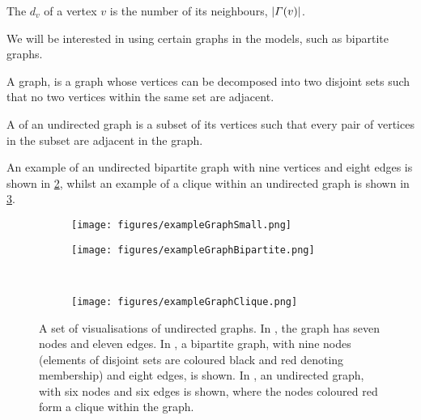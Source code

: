 \begin{definition}
	\label{def:degreeNode}
	The  $d_{v}$ of a vertex $v$ is the number of its neighbours, $\left\vert\Gamma(v)\right\vert$.
\end{definition}
We will be interested in using certain graphs in the models, such as bipartite graphs.
\begin{definition}
	\label{def:bipartiteGraph}
	A  graph, is a graph whose vertices can be decomposed into two disjoint sets such that no two vertices within the same set are adjacent.
\end{definition}
\begin{definition}
	\label{def:clique}
	A  of an undirected graph is a subset of its vertices such that every pair of vertices in the subset are adjacent in the graph.
\end{definition}
An example of an undirected bipartite graph with nine vertices and eight edges is shown in \cref{fig:exampleGraphBipartite}, whilst an example of a clique within an undirected graph is shown in \cref{fig:exampleGraphClique}.

\begin{figure}
\centering
	\begin{subfigure}{.5\textwidth}
		\centering
		\texttt{[image: figures/exampleGraphSmall.png]}
		\caption{}
		\label{fig:exampleGraphSmall}
	\end{subfigure}%
	\begin{subfigure}{.5\textwidth}
		\centering
		\texttt{[image: figures/exampleGraphBipartite.png]}
		\caption{}
		\label{fig:exampleGraphBipartite}
	\end{subfigure}\\
	\begin{subfigure}{.5\textwidth}
		\centering
		\texttt{[image: figures/exampleGraphClique.png]}
		\caption{}
		\label{fig:exampleGraphClique}
	\end{subfigure}
	\caption[Visualisations of example undirected graphs.]{\label{fig:exampleGraphs} A set of visualisations of undirected graphs. In , the graph has seven nodes and eleven edges. In , a bipartite graph, with nine nodes (elements of disjoint sets are coloured black and red denoting membership) and eight edges, is shown. In , an undirected graph, with six nodes and six edges is shown, where the nodes coloured red form a clique within the graph.}
\end{figure}

